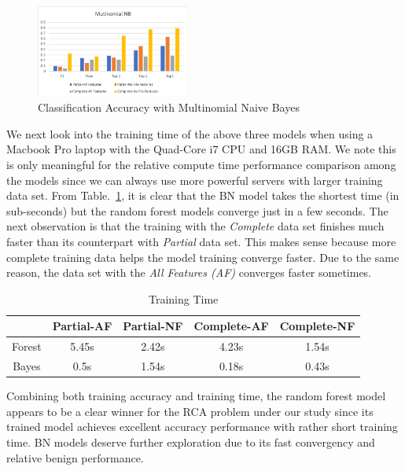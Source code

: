 \begin{figure}[!ht]
\begin{center}
\includegraphics[width=0.45\textwidth]{./figure/nb-accuracy}
\end{center}
\caption{Classification Accuracy with Multinomial Naive Bayes}
\label{fig:bn}
\end{figure}

We next look into the training time of the above three models when using a Macbook Pro laptop with the Quad-Core i7 CPU and 16GB RAM. We note this is only meaningful for the relative compute time performance comparison among the models since we can always use more powerful servers with larger training data set. From Table.~\ref{tab:time}, it is clear that the BN model takes the shortest time (in sub-seconds) but the random forest models converge just in a few seconds. The next observation is that the training with the {\it Complete} data set finishes much faster than its counterpart with {\it Partial} data set. This makes sense because more complete training data helps the model training converge faster. Due to the same reason, the data set with the {\it All Features (AF)} converges faster sometimes.

\begin{table}[!ht]
\caption{Training Time }
\label{tab:time}
\begin{center}
\begin{tabular}{ |c|c|c|c|c| } 
 \hline
  & Partial-AF & Partial-NF & Complete-AF & Complete-NF\\ 
 \hline
 Forest & 5.45s & 2.42s & 4.23s & 1.54s\\ 
 \hline
 Bayes & 0.5s & 1.54s & 0.18s & 0.43s\\
 \hline
\end{tabular}
\end{center}
\end{table}

Combining both training accuracy and training time, the random forest model appears to be a clear winner for the RCA problem under our study since its trained model achieves excellent accuracy performance with rather short training time. BN models deserve further exploration due to its fast convergency and relative benign performance.

